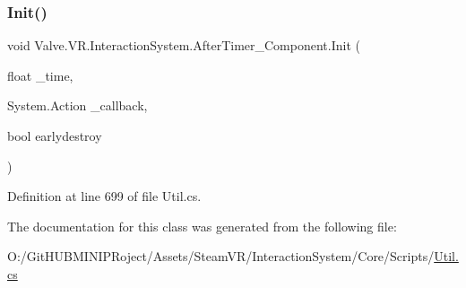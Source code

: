 \subsubsection{\texorpdfstring{Init()}{Init()}}
{\footnotesize\ttfamily void Valve.\+V\+R.\+Interaction\+System.\+After\+Timer\+\_\+\+Component.\+Init (\begin{DoxyParamCaption}\item[{float}]{\+\_\+time,  }\item[{System.\+Action}]{\+\_\+callback,  }\item[{bool}]{earlydestroy }\end{DoxyParamCaption})}



Definition at line 699 of file Util.\+cs.



The documentation for this class was generated from the following file\+:\begin{DoxyCompactItemize}
\item 
O\+:/\+Git\+H\+U\+B\+M\+I\+N\+I\+P\+Roject/\+Assets/\+Steam\+V\+R/\+Interaction\+System/\+Core/\+Scripts/\mbox{\hyperlink{_util_8cs}{Util.\+cs}}\end{DoxyCompactItemize}
